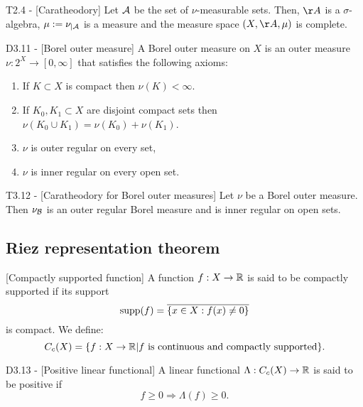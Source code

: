 \documentclass{article}
\begin{document}
\begin{flexitheorem}{T2.4 - }[Caratheodory]
    Let $\mathcal{A}$ be the set of $\nu$-measurable sets. Then, $\AA$ is a $\sigma$-algebra, $\mu := \nu_{|\mathcal{A}}$ is a measure and the measure space $(X, \AA, \mu)$ is complete.
\end{flexitheorem}

\begin{flexidefinition}{D3.11 - }[Borel outer measure]
    A Borel outer measure on $X$ is an outer measure $\nu : 2^X \to [0, \infty]$ that satisfies the following axioms:
    \begin{enumerate}[label = (\alph*)]
        \item If $K \subset X$ is compact then $\nu(K) < \infty$.
        \item If $K_0,K_1 \subset X$ are disjoint compact sets then $\nu(K_0 \cup K_1) = \nu(K_0) + \nu(K_1)$.
        \item $\nu$ is outer regular on every set,
        \item $\nu$ is inner regular on every open set.
    \end{enumerate}
\end{flexidefinition}

\begin{flexitheorem}{T3.12 - }[Caratheodory for Borel outer measures]
    Let $\nu$ be a Borel outer measure. Then $\nu_{\mathcal{B}}$ is an outer regular Borel measure and is inner regular on open sets.
\end{flexitheorem}

\subsection{Riez representation theorem}

\begin{flexidefinition}{}[Compactly supported function]
    A function $f : X \to \mathbb{R}$ is said to be compactly supported if its support 
    \begin{equation}
        \operatorname{supp}(f) = \overline{\left\{x \in X : f(x) \neq 0 \right\}}
    \end{equation}
    is compact. We define:
    \begin{equation}
        C_c(X) = \{f : X \to \mathbb{R} | f \text{ is continuous and compactly supported}\}.
    \end{equation}
\end{flexidefinition}

\begin{flexidefinition}{D3.13 - }[Positive linear functional]
    A linear functional $\Lambda : C_c(X) \to \mathbb{R}$ is said to be positive if 
    \begin{equation}
        f \geq 0 \Rightarrow \Lambda(f) \geq 0.
    \end{equation}
\end{flexidefinition}
\end{document}
